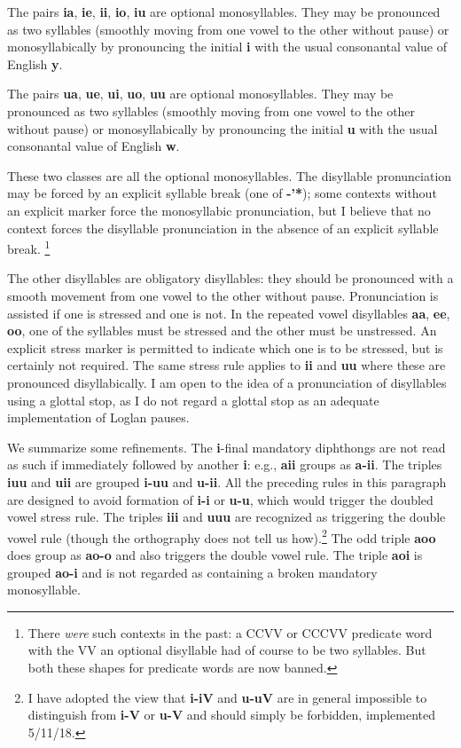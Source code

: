 \documentclass[12pt]{book}
\begin{document}
The pairs {\bf ia}, {\bf ie}, {\bf ii}, {\bf io}, {\bf iu} are optional monosyllables.  They may be pronounced as two syllables (smoothly moving from one vowel to the other without pause)
or monosyllabically by pronouncing the initial {\bf i} with the usual consonantal value of English {\bf y}.

The pairs {\bf ua}, {\bf ue}, {\bf ui}, {\bf uo}, {\bf uu} are optional monosyllables.  They may be pronounced as two syllables (smoothly moving from one vowel to the other without pause)
or monosyllabically by pronouncing the initial {\bf u} with the usual consonantal value of English {\bf w}.

These two classes are all the optional monosyllables.  The disyllable pronunciation may be forced by an explicit syllable break (one of {\bf -'*}); some contexts without an explicit marker force the monosyllabic pronunciation, but I believe that no context forces the disyllable pronunciation in the absence of an explicit syllable break.  \footnote{There {\em were\/} such contexts in the past:  a CCVV or CCCVV predicate word with the VV an optional disyllable had of course to be two syllables.  But both these shapes for predicate words are now banned.}


The other disyllables are obligatory disyllables:  they should be pronounced with a smooth movement from one vowel to the other without pause.   Pronunciation is assisted if one is stressed and one is not.   In the repeated vowel disyllables {\bf aa}, {\bf ee}, {\bf oo}, one of the syllables must be stressed and the other must be unstressed.  An explicit stress marker is permitted to indicate which one is to be stressed, but is certainly not required.  The same stress rule applies to {\bf ii} and {\bf uu} where these are pronounced disyllabically.  I am open to the idea of a pronunciation of disyllables using a glottal stop, as I do not regard a glottal stop as an adequate implementation of Loglan pauses.

We summarize some refinements.  The {\bf i}-final mandatory diphthongs are not read as such if immediately followed by another {\bf i}:  e.g.,
{\bf aii} groups as {\bf a-ii}.  The triples {\bf iuu} and {\bf uii} are grouped {\bf i-uu} and {\bf u-ii}.   All the preceding rules in this paragraph are designed to avoid formation of {\bf i-i} or {\bf u-u}, which would trigger the doubled vowel stress rule. The triples {\bf iii} and {\bf uuu} are recognized
as triggering the double vowel rule (though the orthography does not tell us how).\footnote{I have adopted the view that {\bf i-iV} and {\bf u-uV} are in general impossible to distinguish from  {\bf i-V} or {\bf u-V} and should simply be forbidden, implemented 5/11/18.}   The odd triple {\bf aoo} does group as {\bf ao-o} and also 
triggers the double vowel rule.  The triple {\bf aoi} is grouped {\bf ao-i} and is not regarded as containing a broken mandatory monosyllable.
\end{document}
